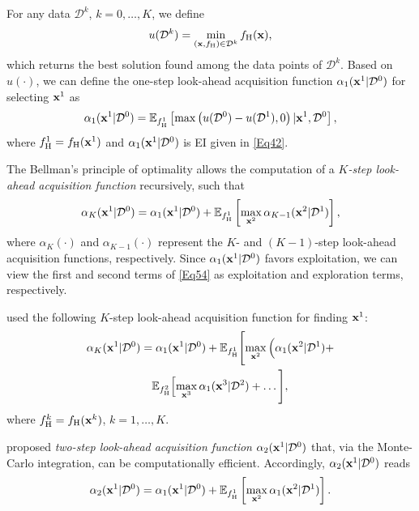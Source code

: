 \documentclass[iicol,sn-basic]{sn-jnl}%
\begin{document}
For any data $\mathcal{D}^k$, $k=0,\dots,K$, we define
\begin{equation}\label{Eq52}
	u(\mathcal{D}^k) = \underset{({\bf x},f_{\text{H}}) \in \mathcal{D}^k}{\min}\,f_{\text{H}}({\bf x}),
\end{equation} 
which returns the best solution found among the data points of $\mathcal{D}^k$.
Based on $u(\cdot)$, we can define the one-step look-ahead acquisition function $\alpha_1({\bf x}^1|\mathcal{D}^{0})$ for selecting ${\bf x}^1$ as
\begin{equation}\label{Eq53}
	\alpha_1({\bf x}^1|\mathcal{D}^0)
	=\mathbb{E}_{f^1_\text{H}}\left[\max\left(u(\mathcal{D}^0) - u(\mathcal{D}^1),0\right)
	|{\bf x}^1,\mathcal{D}^0\right],
\end{equation} 
where $f^1_\text{H} = f_\text{H}({\bf x}^1)$ and $\alpha_1({\bf x}^1|\mathcal{D}^{0})$ is EI given in \cref{Eq42}.

The Bellman's principle of optimality allows the computation of a \textit{$K$-step look-ahead acquisition function} recursively, such that~\citep{Bellman1952}
\begin{equation}\label{Eq54}
	\alpha_K({\bf x}^1|\mathcal{D}^0)
	=\alpha_1({\bf x}^1|\mathcal{D}^0) + \mathbb{E}_{f^1_\text{H}}\left[\underset{{\bf x}^2}{\max}\,\alpha_{K-1}({\bf x}^2|\mathcal{D}^1)\right],
\end{equation}
where $\alpha_K(\cdot)$ and $\alpha_{K-1}(\cdot)$ represent the $K$- and $(K-1)$-step look-ahead acquisition functions, respectively.
Since $\alpha_1({\bf x}^1|\mathcal{D}^0)$ favors exploitation, we can view the first and second terms of \cref{Eq54} as exploitation and exploration terms, respectively.

\cite{Jiang2020} used the following $K$-step look-ahead acquisition function for finding ${\bf x}^1$:
\begin{equation}\label{Eq55}
	\begin{aligned}
		\alpha_K({\bf x}^1|\mathcal{D}^0) &  = \alpha_1({\bf x}^1|\mathcal{D}^0) +\mathbb{E}_{f_\text{H}^1}\Bigg[\underset{{\bf x}^2}{\max}\,\Big(\alpha_1({{\bf x}}^2|\mathcal{D}^1) + \\
		& \quad \mathbb{E}_{f_\text{H}^2}\Big[\underset{{\bf x}^3}{\max}\,\alpha_1({\bf x}^3|\mathcal{D}^2)+\dots  \Bigg],
	\end{aligned}
\end{equation}
where $f^k_\text{H} = f_\text{H}({\bf x}^k)$, $k=1,\dots,K$.

\cite{WuJ2019} proposed \textit{two-step look-ahead acquisition function} $\alpha_2({\bf x}^1|\mathcal{D}^0)$ that, via the Monte-Carlo integration, can be computationally efficient.
Accordingly, $\alpha_2({\bf x}^1|\mathcal{D}^0)$ reads
\begin{equation}\label{Eq56}
		\alpha_2({\bf x}^1|\mathcal{D}^0) =\alpha_1({\bf x}^1|\mathcal{D}^0) + \mathbb{E}_{f^1_\text{H}}\left[\underset{{\bf x}^2}{\max}\,\alpha_1({\bf x}^2|\mathcal{D}^1)\right].
\end{equation}
\end{document}
